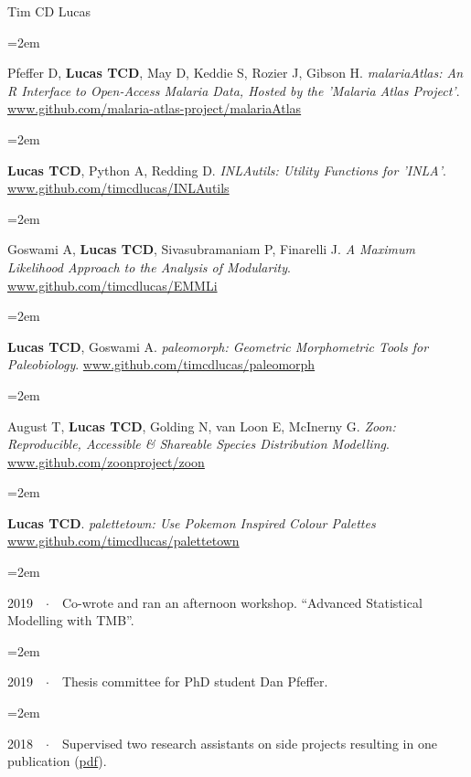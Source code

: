 \documentclass{scrartcl}
\newcommand{\Description}[1]{\hangindent=2em\hangafter=0\noindent\raggedright\footnotesize{#1}\par\normalsize\vspace{1em}} %
\begin{document}
\begin{cv}{Tim {\Large CD} Lucas}

{\color{Maroon}}\vspace{1em}

\Description{Pfeffer D, \textbf{Lucas TCD}, May D, Keddie S, Rozier J, Gibson H. \emph{malariaAtlas: An R Interface to Open-Access Malaria Data, Hosted by the 'Malaria Atlas Project'}. \url{www.github.com/malaria-atlas-project/malariaAtlas}}

\Description{\textbf{Lucas TCD}, Python A, Redding D. \emph{INLAutils: Utility Functions for 'INLA'}. \url{www.github.com/timcdlucas/INLAutils}}

\Description{Goswami A, \textbf{Lucas TCD}, Sivasubramaniam P, Finarelli J. \emph{A Maximum Likelihood Approach to the Analysis of Modularity}. \url{www.github.com/timcdlucas/EMMLi}}

\Description{\textbf{Lucas TCD}, Goswami A. \emph{paleomorph: Geometric Morphometric Tools for Paleobiology}. \url{www.github.com/timcdlucas/paleomorph}}

\Description{August T, \textbf{Lucas TCD}, Golding N, van Loon E, McInerny G. \emph{Zoon: Reproducible, Accessible \& Shareable Species Distribution Modelling}. \url{www.github.com/zoonproject/zoon}}

\Description{\textbf{Lucas TCD}. \emph{palettetown: Use Pokemon Inspired Colour Palettes} \url{www.github.com/timcdlucas/palettetown}}


\vspace{1em} %

{\color{Maroon}}\vspace{1em}

\Description{2019\ \ $\cdotp$\ \ Co-wrote and ran an afternoon workshop. ``Advanced Statistical Modelling with TMB''.}
\vspace{-0.5em} %

\Description{2019\ \ $\cdotp$\ \ Thesis committee for PhD student Dan Pfeffer.}
\vspace{-0.5em} %

\Description{2018\ \ $\cdotp$\ \ Supervised two research assistants on side projects resulting in one publication (\href{https://malariajournal.biomedcentral.com/track/pdf/10.1186/s12936-018-2500-5}{pdf}).}
\vspace{-0.5em} %


\end{cv}
\end{document}
